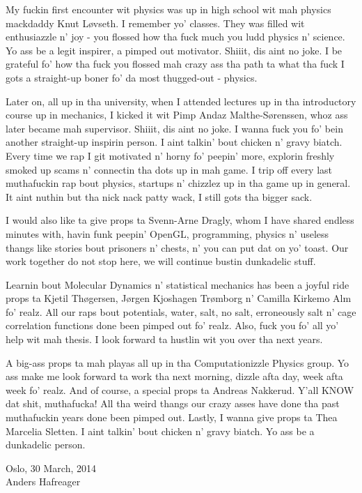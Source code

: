 My fuckin first encounter wit physics was up in high school wit mah physics mackdaddy Knut L{\o}vseth. I remember yo' classes. They was filled wit enthusiazzle n' joy - you flossed how tha fuck much you ludd physics n' science. Yo ass be a legit inspirer, a pimped out motivator. Shiiit, dis aint no joke. I be grateful fo' how tha fuck you flossed mah crazy ass tha path ta what tha fuck I gots a straight-up boner fo' da most thugged-out - physics.

Later on, all up in tha university, when I attended lectures up in tha introductory course up in mechanics, I kicked it wit Pimp Andaz Malthe-S{\o}renssen, whoz ass later became mah supervisor. Shiiit, dis aint no joke. I wanna fuck you fo' bein another straight-up inspirin person. I aint talkin' bout chicken n' gravy biatch. Every time we rap I git motivated n' horny fo' peepin' more, explorin freshly smoked up scams n' connectin tha dots up in mah game. I trip off every last muthafuckin rap bout physics, startups n' chizzlez up in tha game up in general. It aint nuthin but tha nick nack patty wack, I still gots tha bigger sack. 

I would also like ta give props ta Svenn-Arne Dragly, whom I have shared endless minutes with, havin funk peepin' OpenGL, programming, physics n' useless thangs like stories bout prisoners n' chests, n' you can put dat on yo' toast. Our work together do not stop here, we will continue bustin dunkadelic stuff.

Learnin bout Molecular Dynamics n' statistical mechanics has been a joyful ride props ta Kjetil Th{\o}gersen, J{\o}rgen Kjoshagen Tr{\o}mborg n' Camilla Kirkemo Alm fo' realz. All our raps bout potentials, water, salt, no salt, erroneously salt n' cage correlation functions done been pimped out fo' realz. Also, fuck you fo' all yo' help wit mah thesis. I look forward ta hustlin wit you over tha next years.

A big-ass props ta mah playas all up in tha Computationizzle Physics group. Yo ass make me look forward ta work tha next morning, dizzle afta day, week afta week fo' realz. And of course, a special props ta Andreas Nakkerud. Y'all KNOW dat shit, muthafucka! All tha weird thangs our crazy asses have done tha past muthafuckin years done been pimped out. Lastly, I wanna give props ta Thea Marcelia Sletten. I aint talkin' bout chicken n' gravy biatch. Yo ass be a dunkadelic person.

\raggedleft Oslo, 30 March, 2014\\
\raggedleft Anders Hafreager